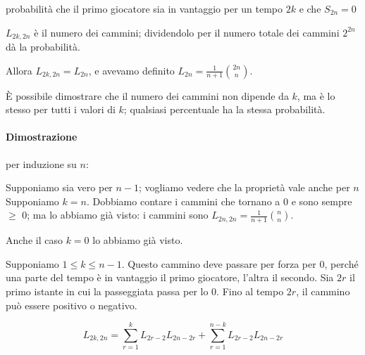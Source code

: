 \documentclass[a4paper,12pt]{book}
\newcommand\ddfrac[2]{\frac{\displaystyle #1}{\displaystyle #2}}
\begin{document}
 { probabilità che il primo giocatore  sia in vantaggio per un tempo $ 2k $ e che $ S_{2n} = 0 $}

$ L_{2k, 2n} $ è il numero dei cammini; dividendolo per il numero totale dei cammini $ 2^{2n} $ dà la probabilità. 

Allora $ L_{2k, 2n} = L_{2n} $, e avevamo definito $ L_{2n} = \ddfrac{1}{n+1}	\binom{\displaystyle 2n}{\displaystyle n} $.

È possibile dimostrare che il numero dei cammini non dipende da $ k $, ma è lo stesso per tutti i valori di $ k $; qualsiasi percentuale ha la stessa probabilità.

\paragraph{Dimostrazione} per induzione su $ n $:
\begin{multicols}{2}
	
	
	Supponiamo sia vero per $ n-1 $; vogliamo vedere che la proprietà vale anche per $ n $
	Supponiamo $ k = n $. Dobbiamo contare i cammini che tornano a 0 e sono sempre $ \ge $ 0; ma lo abbiamo già visto: i cammini sono $ L_{2n, 2n} = \ddfrac{1}{n+1}\binom{\displaystyle n}{\displaystyle n} $.


	Anche il caso $ k = 0 $ lo abbiamo già visto. 
	
\end{multicols}

Supponiamo $ 1 \le k \le n-1 $. Questo cammino deve passare per forza per 0, perché una parte del tempo è in vantaggio il primo giocatore, l'altra il secondo. Sia $ 2r $ il primo istante in cui la passeggiata passa per lo 0. Fino al tempo $ 2r $, il cammino può essere positivo o negativo. 

$$ L_{2k,2n} = \sum_{r=1}^{k} L_{2r-2} L_{2n-2r} + \sum_{r=1}^{n-k} L_{2r-2} L_{2n-2r}$$
\end{document}
